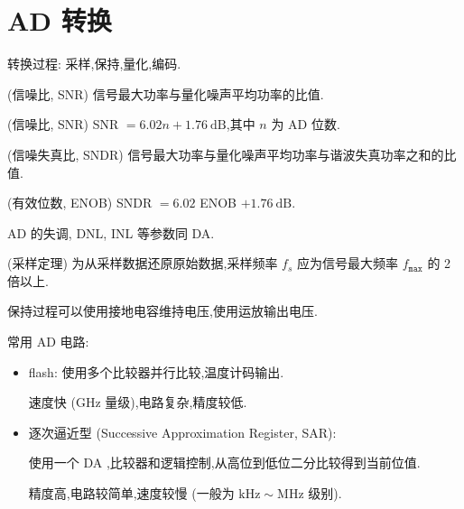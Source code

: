 
\usepackage{../../lectures_preamble}


    \section{AD 转换}
    转换过程:
        采样,保持,量化,编码.
    \begin{definition}
        (信噪比, SNR) 信号最大功率与量化噪声平均功率的比值.
    \end{definition}
    \begin{theorem}
        (信噪比, SNR) SNR $=6.02n+1.76 \ \mathrm{dB}$,其中 $n$ 为 AD 位数.
    \end{theorem}
    \begin{definition}
        (信噪失真比, SNDR) 信号最大功率与量化噪声平均功率与谐波失真功率之和的比值.
    \end{definition}
    \begin{definition}
        (有效位数, ENOB) SNDR $=6.02$ ENOB $+1.76 \ \mathrm{dB}$.
    \end{definition}
    AD 的失调, DNL, INL 等参数同 DA.
    \begin{theorem}
        (采样定理) 为从采样数据还原原始数据,采样频率 $f_{s}$ 应为信号最大频率 $f_{\texttt{max}}$ 的 2 倍以上.
    \end{theorem}
    保持过程可以使用接地电容维持电压,使用运放输出电压.

    常用 AD 电路:
    \begin{itemize}
        \item flash: 使用多个比较器并行比较,温度计码输出.

            速度快 ($\mathrm{GHz}$ 量级),电路复杂,精度较低.
        \item 逐次逼近型 (Successive Approximation Register, SAR): 

            使用一个 DA ,比较器和逻辑控制,从高位到低位二分比较得到当前位值.

            精度高,电路较简单,速度较慢 (一般为 $\mathrm{kHz}\sim{}\mathrm{MHz}$ 级别).
    \end{itemize}

